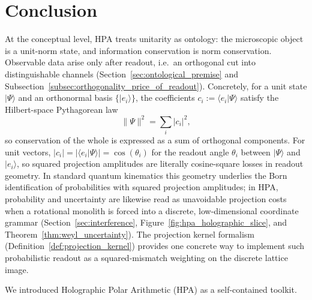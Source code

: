 \section{Conclusion}
\label{sec:conclusion}

At the conceptual level, HPA treats unitarity as ontology: the microscopic object is a unit-norm state, and information conservation is norm conservation.
Observable data arise only after readout, i.e.\ an orthogonal cut into distinguishable channels (Section~\ref{sec:ontological_premise} and Subsection~\ref{subsec:orthogonality_price_of_readout}).
Concretely, for a unit state $|\Psi\rangle$ and an orthonormal basis $\{|e_i\rangle\}$, the coefficients $c_i:=\langle e_i|\Psi\rangle$ satisfy the Hilbert-space Pythagorean law
$$
\|\Psi\|^2=\sum_i |c_i|^2,
$$
so conservation of the whole is expressed as a sum of orthogonal components.
For unit vectors, $|c_i|=|\langle e_i|\Psi\rangle|=\cos(\theta_i)$ for the readout angle $\theta_i$ between $|\Psi\rangle$ and $|e_i\rangle$, so squared projection amplitudes are literally cosine-square losses in readout geometry.
In standard quantum kinematics this geometry underlies the Born identification of probabilities with squared projection amplitudes; in HPA, probability and uncertainty are likewise read as unavoidable projection costs when a rotational monolith is forced into a discrete, low-dimensional coordinate grammar (Section~\ref{sec:interference}, Figure~\ref{fig:hpa_holographic_slice}, and Theorem~\ref{thm:weyl_uncertainty}).
The projection kernel formalism (Definition~\ref{def:projection_kernel}) provides one concrete way to implement such probabilistic readout as a squared-mismatch weighting on the discrete lattice image.
\par

We introduced Holographic Polar Arithmetic (HPA) as a self-contained toolkit.

